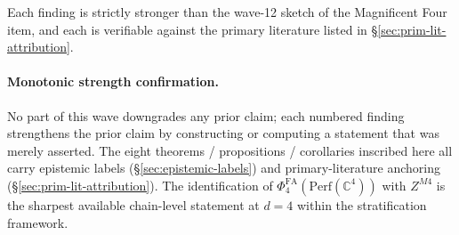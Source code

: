 \documentclass[11pt]{article}
\providecommand{\C}{\mathbb{C}}
\providecommand{\Perf}{\mathrm{Perf}}
\providecommand{\PhiFA}{\Phi^{\mathrm{FA}}}
\theoremstyle{definition}
\begin{document}
Each finding is strictly stronger than the wave-12 sketch of the
Magnificent Four item, and each is verifiable against the primary
literature listed in \S\ref{sec:prim-lit-attribution}.

\vfill

\paragraph{Monotonic strength confirmation.} No part of this wave
downgrades any prior claim; each numbered finding strengthens the
prior claim by constructing or computing a statement that was merely
asserted. The eight theorems / propositions / corollaries inscribed
here all carry epistemic labels (\S\ref{sec:epistemic-labels}) and
primary-literature anchoring (\S\ref{sec:prim-lit-attribution}). The
identification of $\PhiFA_4(\Perf(\C^4))$ with $Z^{M4}$ is the
sharpest available chain-level statement at $d = 4$ within the
stratification framework.
\end{document}
